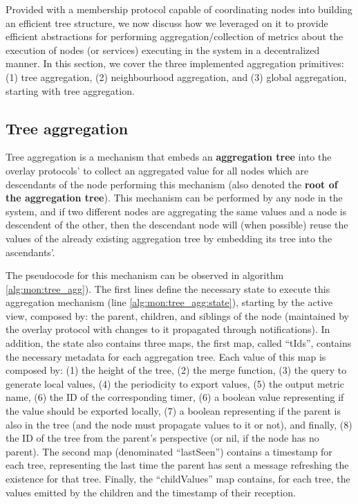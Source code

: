 
Provided with a membership protocol capable of coordinating nodes into building an efficient tree structure, we now discuss how we leveraged on it to provide efficient abstractions for performing aggregation/collection of metrics about the execution of nodes (or services) executing in the system in a decentralized manner. In this section, we cover the three implemented aggregation primitives: (1) tree aggregation, (2) neighbourhood aggregation, and (3) global aggregation, starting with tree aggregation.

\subsection{Tree aggregation} \label{sec:mon_protocol:tree_agg}

Tree aggregation is a mechanism that embeds an \textbf{aggregation tree} into the overlay protocols' to collect an aggregated value for all nodes which are descendants of the node performing this mechanism (also denoted the \textbf{root of the aggregation tree}). This mechanism can be performed by any node in the system, and if two different nodes are aggregating the same values and a node is descendent of the other, then the descendant node will (when possible) reuse the values of the already existing aggregation tree by embedding its tree into the ascendants'.

The pseudocode for this mechanism can be observed in algorithm \ref{alg:mon:tree_agg}). The first lines define the necessary state to execute this aggregation mechanism (line \ref{alg:mon:tree_agg:state}), starting by the active view, composed by: the parent, children, and siblings of the node (maintained by the overlay protocol with changes to it propagated through notifications). In addition, the state also contains three maps, the first map, called ``tIds'', contains the necessary metadata for each aggregation tree. Each value of this map is composed by: (1) the height of the tree, (2) the merge function, (3) the query to generate local values, (4) the periodicity to export values, (5) the output metric name, (6) the ID of the corresponding timer, (6) a boolean value representing if the value should be exported locally, (7) a boolean representing if the parent is also in the tree (and the node must propagate values to it or not), and finally, (8) the ID of the tree from the parent's perspective (or nil, if the node has no parent). The second map (denominated ``lastSeen'') contains a timestamp for each tree, representing the last time the parent has sent a message refreshing the existence for that tree. Finally, the ``childValues'' map contains, for each tree, the values emitted by the children and the timestamp of their reception.


